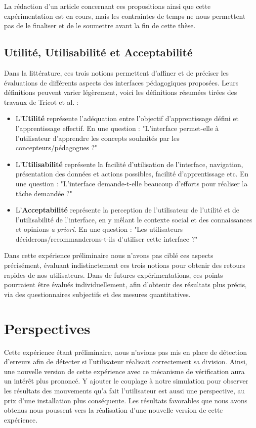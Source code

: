 	 La rédaction d'un article concernant ces propositions ainsi que cette expérimentation est en cours, mais les contraintes de temps ne nous permettent pas de le finaliser et de le soumettre avant la fin de cette thèse.
		
		\subsection{Utilité, Utilisabilité et Acceptabilité}
		Dans la littérature, ces trois notions permettent d'affiner et de préciser les évaluations de différents aspects des interfaces pédagogiques proposées. Leurs définitions peuvent varier légèrement, voici les définitions résumées tirées des travaux de Tricot et al. \cite{tricot_utilite_2003} :
		\begin{itemize}
			\item L'\textbf{Utilité} représente l'adéquation entre l'objectif d'apprentissage défini et l'apprentissage effectif. En une question : "L'interface permet-elle à l'utilisateur d'apprendre les concepts souhaités par les concepteurs/pédagogues ?"
			\item L'\textbf{Utilisabilité} représente la facilité d'utilisation de l'interface, navigation, présentation des données et actions possibles, facilité d'apprentissage etc. En une question : "L'interface demande-t-elle beaucoup d'efforts pour réaliser la tâche demandée ?"
			\item L'\textbf{Acceptabilité} représente la perception de l'utilisateur de l'utilité et de l'utilisabilité de l'interface, en y mêlant le contexte social et des connaissances et opinions \textit{a priori}. En une question : "Les utilisateurs déciderons/recommanderons-t-ils d'utiliser cette interface ?"
		\end{itemize}
		
		Dans cette expérience préliminaire nous n'avons pas ciblé ces aspects précisément, évaluant indistinctement ces trois notions pour obtenir des retours rapides de nos utilisateurs. Dans de futures expérimentations, ces points pourraient être évalués individuellement, afin d'obtenir des résultats plus précis, via des questionnaires subjectifs et des mesures quantitatives.
	
	\section{Perspectives}
 	Cette expérience étant préliminaire, nous n'avions pas mis en place de détection d'erreurs afin de détecter si l'utilisateur réalisait correctement sa division. Ainsi, une nouvelle version de cette expérience avec ce mécanisme de vérification aura un intérêt plus prononcé. Y ajouter le couplage à notre simulation pour observer les résultats des mouvements qu'a fait l'utilisateur est aussi une perspective, au prix d'une installation plus conséquente. Les résultats favorables que nous avons obtenus nous poussent vers la réalisation d'une nouvelle version de cette expérience.
	
